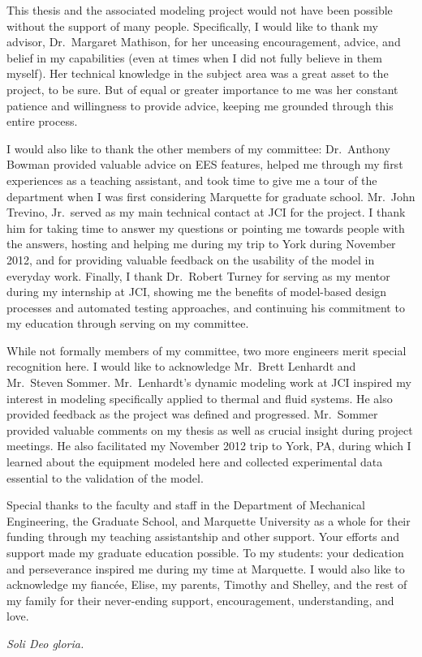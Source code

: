 \begin{acknowledgments}
  This thesis and the associated modeling project 
  would not have been possible without the support of many people. 
  Specifically, I would like to thank my advisor, Dr.~Margaret Mathison,
  for her unceasing encouragement, advice, and belief in my capabilities 
  (even at times when I did not fully believe in them myself). 
  Her technical knowledge in the subject area was a 
  great asset to the project, to be sure.
  But of equal or greater importance to me was 
  her constant patience and willingness to provide advice, 
  keeping me grounded through this entire process.
  
  I would also like to thank the other members of my committee:
  Dr.~Anthony Bowman provided valuable advice on EES features,
  helped me through my first experiences as a teaching assistant, 
  and took time to give me a tour of the department when I was 
  first considering Marquette for graduate school.
  Mr.~John Trevino, Jr.~served as my main technical contact at JCI
  for the project. I thank him for taking time to answer my questions
  or pointing me towards people with the answers, hosting and helping
  me during my trip to York during November 2012, and for providing
  valuable feedback on the usability of the model in everyday work.
  Finally, I thank Dr.~Robert Turney for serving as my mentor
  during my internship at JCI, showing me the benefits of model-based
  design processes and automated testing approaches, and continuing
  his commitment to my education through serving on my committee.
  
  While not formally members of my committee, two more 
  engineers merit special recognition here. 
  I would like to acknowledge Mr.~Brett Lenhardt and Mr.~Steven Sommer.
  Mr.~Lenhardt's dynamic modeling work at JCI inspired my interest
  in modeling specifically applied to thermal and fluid systems.
  He also provided feedback as the project was defined and progressed.
  Mr.~Sommer provided valuable comments on my thesis as well as crucial
  insight during project meetings. He also facilitated my November 2012 trip
  to York, PA, during which I learned about the equipment modeled here
  and collected experimental data essential to the validation of the model.

  Special thanks to the faculty and staff in the Department of 
  Mechanical Engineering, the Graduate School, and Marquette University 
  as a whole for their funding through my teaching assistantship and other support.
  Your efforts and support made my graduate education possible.
  To my students: your dedication and perseverance 
  inspired me during my time at Marquette. 
  I would also like to acknowledge my fianc\'ee, Elise, 
  my parents, Timothy and Shelley, and the rest of my family for their 
  never-ending support, encouragement, understanding, and love.

  \vfill \centering
    \emph{Soli Deo gloria.}
  \vfill
\end{acknowledgments}
